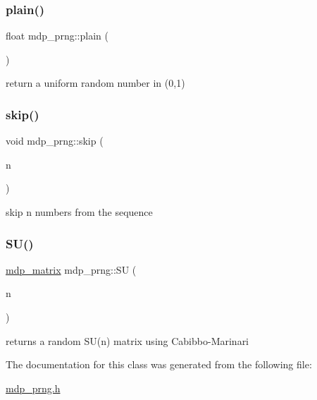 \mbox{\label{classmdp__prng_a261360660403dcd1a76305a8644b6a2d}} 
\subsubsection{\texorpdfstring{plain()}{plain()}}
{\footnotesize\ttfamily float mdp\+\_\+prng\+::plain (\begin{DoxyParamCaption}{ }\end{DoxyParamCaption})\hspace{0.3cm}{\ttfamily [inline]}}



return a uniform random number in (0,1) 

\mbox{\label{classmdp__prng_a6214a2e9ed4d3da1e61544501e710999}} 
\subsubsection{\texorpdfstring{skip()}{skip()}}
{\footnotesize\ttfamily void mdp\+\_\+prng\+::skip (\begin{DoxyParamCaption}\item[{int}]{n }\end{DoxyParamCaption})\hspace{0.3cm}{\ttfamily [inline]}}



skip n numbers from the sequence 

\mbox{\label{classmdp__prng_a348d0a778f0c1e3dd71e163bad950936}} 
\subsubsection{\texorpdfstring{S\+U()}{SU()}}
{\footnotesize\ttfamily \hyperlink{classmdp__matrix}{mdp\+\_\+matrix} mdp\+\_\+prng\+::\+SU (\begin{DoxyParamCaption}\item[{int}]{n }\end{DoxyParamCaption})\hspace{0.3cm}{\ttfamily [inline]}}



returns a random S\+U(n) matrix using Cabibbo-\/\+Marinari 



The documentation for this class was generated from the following file\+:\begin{DoxyCompactItemize}
\item 
\hyperlink{mdp__prng_8h}{mdp\+\_\+prng.\+h}\end{DoxyCompactItemize}

